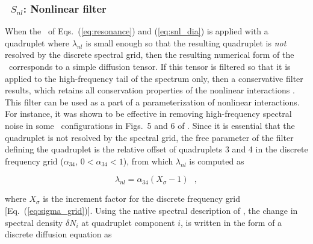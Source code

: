 \vsssub
\subsubsection{~$S_{nl}$: Nonlinear filter} \label{sec:NLS}
\vsssub


\noindent
When the \dia\ of Eqs.~(\ref{eq:resonance}) and (\ref{eq:snl_dia}) is applied
with a quadruplet where $\lambda_{nl}$ is small enough so that the resulting
quadruplet is {\em not} resolved by the discrete spectral grid, then the
resulting numerical form of the \dia\ corresponds to a simple diffusion
tensor. If this tensor is filtered so that it is applied to the high-frequency
tail of the spectrum only, then a conservative filter results, which retains
all conservation properties of the nonlinear interactions \citep{tol:MMAB08b,
tol:OMOD11}. This filter can be used as a part of a parameterization of
nonlinear interactions.  For instance, it was shown to be effective in
removing high-frequency spectral noise in some \gmd\ configurations in Figs.~5
and 6 of \cite{tol:OMOD11}. Since it is essential that the quadruplet is not
resolved by the spectral grid, the free parameter of the filter defining the
quadruplet is the relative offset of quadruplets 3 and 4 in the discrete
frequency grid ($\alpha_{34}$, $0 < \alpha_{34} < 1$), from which
$\lambda_{nl}$ is computed as


\begin{equation}
\lambda_{nl} = \alpha_{34} (X_{\sigma}-1) \:\:\: , \label{eq:nls_a34}
\end{equation}

\noindent 
where $X_{\sigma}$ is the increment factor for the discrete frequency grid
[Eq.~(\ref{eq:sigma_grid})]. Using the native spectral description of \ws, the
change in spectral density $\delta N_i$ at quadruplet component $i$, is
written in the form of a discrete diffusion equation as \citep[page
294]{tol:OMOD11}


